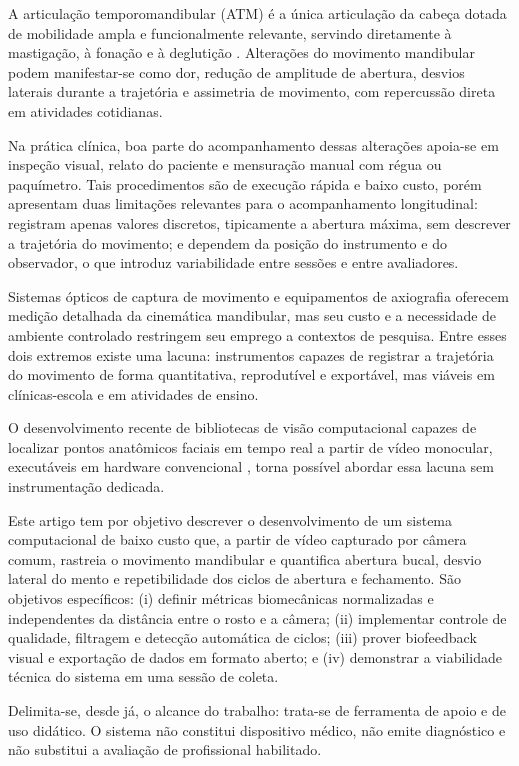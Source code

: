 \documentclass[
    article,
    11pt,
    oneside,
    a4paper,
    english,
    brazil
]{abntex2}
\begin{document}
A articulação temporomandibular (ATM) é a única articulação da cabeça
dotada de mobilidade ampla e funcionalmente relevante, servindo diretamente
à mastigação, à fonação e à deglutição \cite{dufour2016}. Alterações do
movimento mandibular podem manifestar-se como dor, redução de amplitude de
abertura, desvios laterais durante a trajetória e assimetria de movimento,
com repercussão direta em atividades cotidianas.

Na prática clínica, boa parte do acompanhamento dessas alterações apoia-se
em inspeção visual, relato do paciente e mensuração manual com régua ou
paquímetro. Tais procedimentos são de execução rápida e baixo custo, porém
apresentam duas limitações relevantes para o acompanhamento longitudinal:
registram apenas valores discretos, tipicamente a abertura máxima, sem
descrever a trajetória do movimento; e dependem da posição do instrumento e
do observador, o que introduz variabilidade entre sessões e entre
avaliadores.

Sistemas ópticos de captura de movimento e equipamentos de axiografia
oferecem medição detalhada da cinemática mandibular, mas seu custo e a
necessidade de ambiente controlado restringem seu emprego a contextos de
pesquisa. Entre esses dois extremos existe uma lacuna: instrumentos capazes
de registrar a trajetória do movimento de forma quantitativa, reprodutível e
exportável, mas viáveis em clínicas-escola e em atividades de ensino.

O desenvolvimento recente de bibliotecas de visão computacional capazes de
localizar pontos anatômicos faciais em tempo real a partir de vídeo
monocular, executáveis em hardware convencional
\cite{lugaresi2019,kartynnik2019}, torna possível abordar essa lacuna sem
instrumentação dedicada.

Este artigo tem por objetivo descrever o desenvolvimento de um sistema
computacional de baixo custo que, a partir de vídeo capturado por câmera
comum, rastreia o movimento mandibular e quantifica abertura bucal, desvio
lateral do mento e repetibilidade dos ciclos de abertura e fechamento. São
objetivos específicos: (i) definir métricas biomecânicas normalizadas e
independentes da distância entre o rosto e a câmera; (ii) implementar
controle de qualidade, filtragem e detecção automática de ciclos;
(iii) prover biofeedback visual e exportação de dados em formato aberto; e
(iv) demonstrar a viabilidade técnica do sistema em uma sessão de coleta.

Delimita-se, desde já, o alcance do trabalho: trata-se de ferramenta de
apoio e de uso didático. O sistema não constitui dispositivo médico, não
emite diagnóstico e não substitui a avaliação de profissional habilitado.
\end{document}
